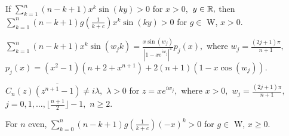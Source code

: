 \documentclass[final]{siamltex}
\begin{document}
\begin{lemma} 
\label{Lemma2}
If $\sum_{k=1}^{n}(n-k+1)x^{k}\sin(ky) > 0$ for $x > 0,$ $y \in {\Bbb R},$ then \newline 
   $\sum_{k=1}^{n}(n-k+1)g \left( \frac{1}{k+c} \right)x^{k}\sin(ky) > 0$ for $g \in$ W, $x > 0.$  \newline
\end{lemma}


 
\begin{lemma} 
\label{Lemma3}
$ \sum_{k=1}^{n}(n-k+1)x^{k}\sin(w_{j}k) = \frac{x\sin(w_{j})}{ \left| 1 - xe^{iw_{j}} \right| ^{4} } p_{j}(x),$ where $w_{j} = \frac{(2j+1)\pi}{n+1},$ \newline $p_{j}(x) = (x^{2}-1)(n+2+x^{n+1}) + 2(n+1)(1-x\cos(w_{j})).$ 
\end{lemma}

\begin{lemma} 
\label{Lemma4}
$C_{n}(z) \overline{ \left( z^{n+1}-1 \right) } \neq i \lambda,$ $\lambda > 0$ for $z = xe^{iw_{j}},$ where $x > 0,$ $w_{j} = \frac{(2j+1)\pi}{n+1},$ $j = 0,1, \ldots, \lfloor \frac{n+1}{2} \rfloor -1,$ $n \geq 2.$ 
\end{lemma}


\begin{lemma} 
\label{Lemma5}
For $n$ even,  $\sum_{k=0}^{n} (n-k+1)g \left( \frac{1}{k+c} \right){(-x)}^{k} > 0$ for $g \in$ W, $x \geq 0.$  \newline
\end{lemma}


\vspace {4 pt}
\end{document}
